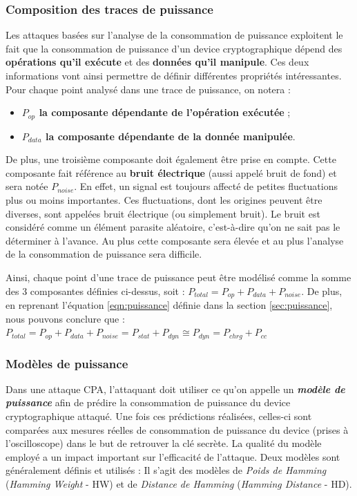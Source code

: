 \documentclass[10pt, oneside, a4paper]{article}
\begin{document}
\subsubsection{Composition des traces de puissance}
Les attaques basées sur l'analyse de la consommation de puissance exploitent le fait que la consommation de puissance d'un device cryptographique dépend des \textbf{opérations qu'il exécute} et des \textbf{données qu'il manipule}. Ces deux informations vont ainsi permettre de définir différentes propriétés intéressantes. Pour chaque point analysé dans une trace de puissance, on notera :
\begin{itemize}
\item \textbf{$P_{op}$ la composante dépendante de l'opération exécutée} ;
\item \textbf{$P_{data}$ la composante dépendante de la donnée manipulée}. \\
\end{itemize}
De plus, une troisième composante doit également être prise en compte. Cette composante fait référence au \textbf{bruit électrique} (aussi appelé bruit de fond) et sera notée \textbf{$P_{noise}$}. En effet, un signal est toujours affecté de petites fluctuations plus ou moins importantes. Ces fluctuations, dont les origines peuvent être diverses, sont appelées bruit électrique (ou simplement bruit). Le bruit est considéré comme un élément parasite aléatoire, c'est-à-dire qu'on ne sait pas le déterminer à l'avance. Au plus cette composante sera élevée et au plus l'analyse de la consommation de puissance sera difficile.

Ainsi, chaque point d'une trace de puissance peut être modélisé comme la somme des 3 composantes définies ci-dessus, soit : 
$P_{total} = P_{op} + P_{data} + P_{noise}$. De plus, en reprenant l'équation \ref{eqn:puissance} définie dans la section \ref{sec:puissance}, nous pouvons conclure que :
$P_{total} = P_{op} + P_{data} + P_{noise} = P_{stat} + P_{dyn} \cong  P_{dyn} = P_{chrg} + P_{cc}$

\subsubsection{Modèles de puissance}
Dans une attaque CPA, l'attaquant doit utiliser ce qu'on appelle un \textbf{\textit{modèle de puissance}} afin de prédire la consommation de puissance du device cryptographique attaqué. Une fois ces prédictions réalisées, celles-ci sont comparées aux mesures réelles de consommation de puissance du device (prises à l'oscilloscope) dans le but de retrouver la clé secrète. La qualité du modèle employé a un impact important sur l'efficacité de l'attaque. Deux modèles sont généralement définis et utilisés : Il s'agit des modèles de \textit{Poids de Hamming} (\textit{Hamming Weight} - HW) et de \textit{Distance de Hamming} (\textit{Hamming Distance} - HD).
\end{document}
